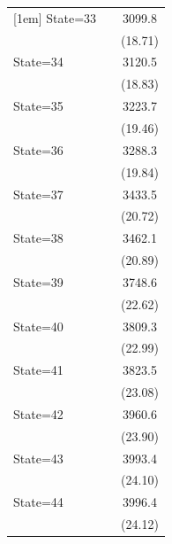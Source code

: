 \documentclass{article}
\begin{document}
{\begin{longtable}{l*{2}{c}}
[1em]
State=33            &                     &      3099.8\sym{***}\\
                    &                     &     (18.71)         \\
[1em]
State=34            &                     &      3120.5\sym{***}\\
                    &                     &     (18.83)         \\
[1em]
State=35            &                     &      3223.7\sym{***}\\
                    &                     &     (19.46)         \\
[1em]
State=36            &                     &      3288.3\sym{***}\\
                    &                     &     (19.84)         \\
[1em]
State=37            &                     &      3433.5\sym{***}\\
                    &                     &     (20.72)         \\
[1em]
State=38            &                     &      3462.1\sym{***}\\
                    &                     &     (20.89)         \\
[1em]
State=39            &                     &      3748.6\sym{***}\\
                    &                     &     (22.62)         \\
[1em]
State=40            &                     &      3809.3\sym{***}\\
                    &                     &     (22.99)         \\
[1em]
State=41            &                     &      3823.5\sym{***}\\
                    &                     &     (23.08)         \\
[1em]
State=42            &                     &      3960.6\sym{***}\\
                    &                     &     (23.90)         \\
[1em]
State=43            &                     &      3993.4\sym{***}\\
                    &                     &     (24.10)         \\
[1em]
State=44            &                     &      3996.4\sym{***}\\
                    &                     &     (24.12)         \\

\end{longtable}}
\end{document}
